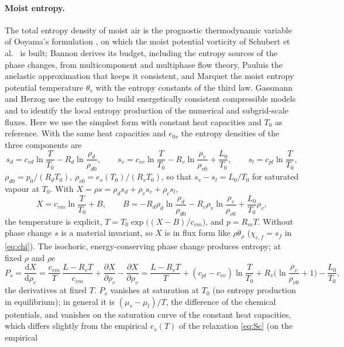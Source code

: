 \documentclass[11pt,a4paper]{article}
\begin{document}
\paragraph{Moist entropy.} The total entropy density of moist air is the prognostic thermodynamic variable of Ooyama's
formulation \cite{ooyama}, on which the moist potential vorticity of Schubert et al.\ \cite{schubert} is built; Bannon
\cite{bannon} derives its budget, including the entropy sources of the phase changes, from multicomponent and multiphase
flow theory, Pauluis \cite{pauluis} the anelastic approximation that keeps it consistent, and Marquet \cite{marquet}
the moist entropy potential temperature $\theta_s$ with the entropy constants of the third law. Gassmann and Herzog
\cite{gassmann08,gassmann15} use the entropy to build energetically consistent compressible models and to identify the
local entropy production of the numerical and subgrid-scale fluxes. Here we use the simplest form with constant
heat capacities and $T_0$ as reference. With the same heat capacities and $e_{0v}$ the entropy densities of the three components are
\[
s_d=c_{vd}\ln\frac T{T_0}-R_d\ln\frac{\rho_d}{\rho_{d0}},\qquad s_v=c_{vv}\ln\frac T{T_0}-R_v\ln\frac{\rho_v}{\rho_{v0}}+\frac{L_0}{T_0},\qquad s_l=c_{pl}\ln\frac T{T_0},
\]
$\rho_{d0}=p_0/(R_dT_0)$, $\rho_{v0}=e_s(T_0)/(R_vT_0)$, so that $s_v-s_l=L_0/T_0$ for saturated vapour at $T_0$. With
$X=\rho s=\rho_ds_d+\rho_vs_v+\rho_cs_l$,
\[
X=c_{vm}\ln\frac T{T_0}+B,\qquad B=-R_d\rho_d\ln\frac{\rho_d}{\rho_{d0}}-R_v\rho_v\ln\frac{\rho_v}{\rho_{v0}}+\frac{L_0}{T_0}\rho_v,
\]
the temperature is explicit, $T=T_0\exp\big((X-B)/c_{vm}\big)$, and $p=R_mT$. Without phase change $s$ is a material invariant, so $X$
is in flux form like $\rho\theta_\rho$ ($\chi_{c,f}=s_f$ in \eqref{eq:chi}). The isochoric, energy-conserving phase change produces
entropy; at fixed $\rho$ and $\rho e$
\begin{equation}
P_s=\frac{\mathrm dX}{\mathrm d\rho_c}=\frac{c_{vm}}T\,\frac{L-R_vT}{c_{vm}}+\frac{\partial X}{\partial\rho_c}-\frac{\partial X}{\partial\rho_v}
=\frac{L-R_vT}T+(c_{pl}-c_{vv})\ln\frac T{T_0}+R_v\Big(\ln\frac{\rho_v}{\rho_{v0}}+1\Big)-\frac{L_0}{T_0},\label{eq:Ps}
\end{equation}
the derivatives at fixed $T$. $P_s$ vanishes at saturation at $T_0$ (no entropy production in equilibrium); in general it
is $(\mu_v-\mu_l)/T$, the difference of the chemical potentials, and vanishes on the saturation curve of the
constant heat capacities, which differs slightly from the empirical $e_s(T)$ of the relaxation \eqref{eq:Sc} (on the empirical
\end{document}
